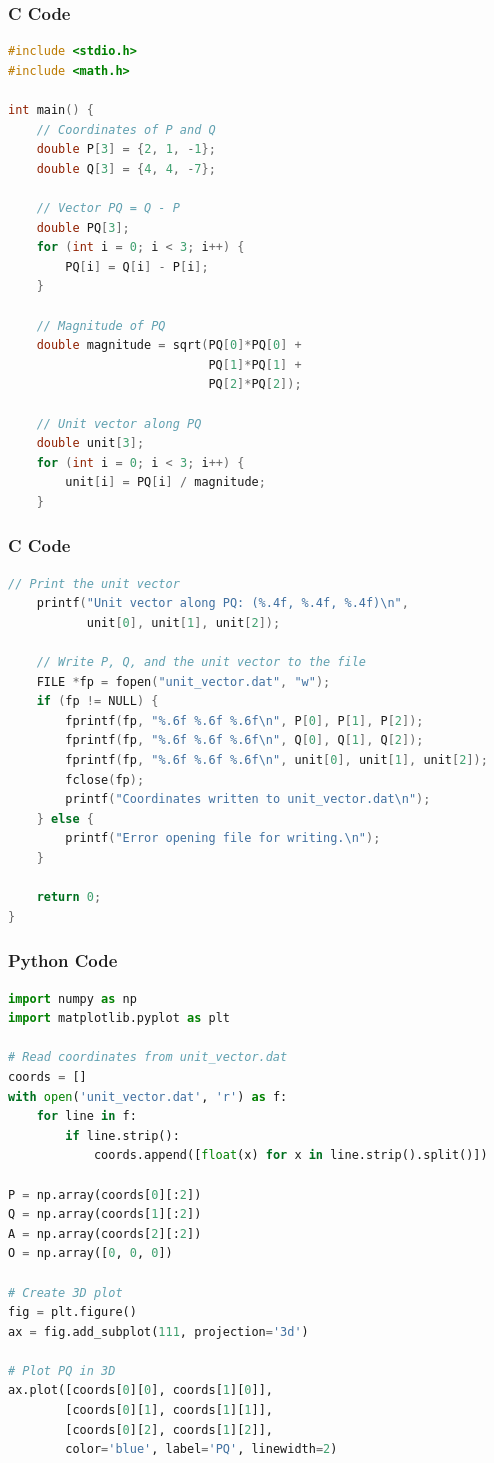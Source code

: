 \documentclass{beamer}
\begin{document}
\begin{frame}[fragile]
    \frametitle{C Code}
    \begin{lstlisting}[language=C]
#include <stdio.h>
#include <math.h>

int main() {
    // Coordinates of P and Q
    double P[3] = {2, 1, -1};
    double Q[3] = {4, 4, -7};

    // Vector PQ = Q - P
    double PQ[3];
    for (int i = 0; i < 3; i++) {
        PQ[i] = Q[i] - P[i];
    }

    // Magnitude of PQ
    double magnitude = sqrt(PQ[0]*PQ[0] + 
                            PQ[1]*PQ[1] + 
                            PQ[2]*PQ[2]);

    // Unit vector along PQ
    double unit[3];
    for (int i = 0; i < 3; i++) {
        unit[i] = PQ[i] / magnitude;
    }
    \end{lstlisting}
\end{frame}

\begin{frame}[fragile]
    \frametitle{C Code}
    \begin{lstlisting}[language=C]
    // Print the unit vector
    printf("Unit vector along PQ: (%.4f, %.4f, %.4f)\n",
           unit[0], unit[1], unit[2]);

    // Write P, Q, and the unit vector to the file
    FILE *fp = fopen("unit_vector.dat", "w");
    if (fp != NULL) {
        fprintf(fp, "%.6f %.6f %.6f\n", P[0], P[1], P[2]);
        fprintf(fp, "%.6f %.6f %.6f\n", Q[0], Q[1], Q[2]);
        fprintf(fp, "%.6f %.6f %.6f\n", unit[0], unit[1], unit[2]);
        fclose(fp);
        printf("Coordinates written to unit_vector.dat\n");
    } else {
        printf("Error opening file for writing.\n");
    }

    return 0;
}
    \end{lstlisting}
\end{frame}

\begin{frame}[fragile]
    \frametitle{Python Code}
    \begin{lstlisting}[language=Python]
import numpy as np
import matplotlib.pyplot as plt

# Read coordinates from unit_vector.dat
coords = []
with open('unit_vector.dat', 'r') as f:
    for line in f:
        if line.strip():
            coords.append([float(x) for x in line.strip().split()])

P = np.array(coords[0][:2])
Q = np.array(coords[1][:2])
A = np.array(coords[2][:2])
O = np.array([0, 0, 0])

# Create 3D plot
fig = plt.figure()
ax = fig.add_subplot(111, projection='3d')

# Plot PQ in 3D
ax.plot([coords[0][0], coords[1][0]],
        [coords[0][1], coords[1][1]],
        [coords[0][2], coords[1][2]],
        color='blue', label='PQ', linewidth=2)
    \end{lstlisting}
\end{frame}
\end{document}
